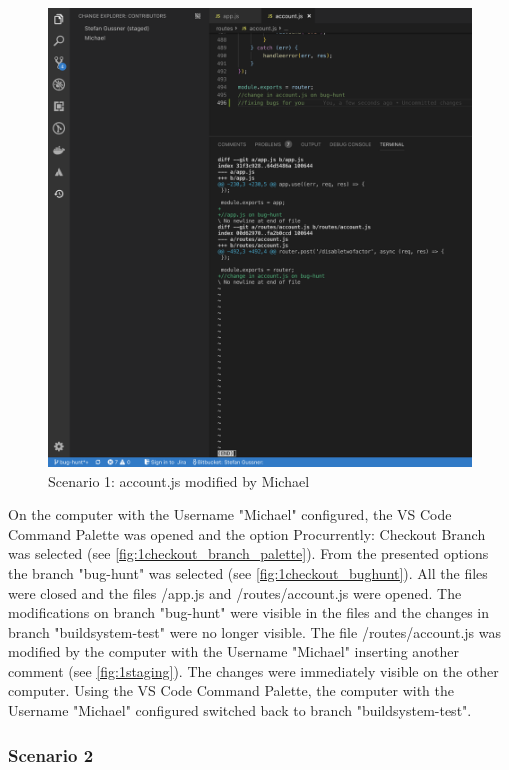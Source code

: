 \begin{figure}[h]
    \centering
    \includegraphics[width=1\textwidth]{figures/screenshots/scenarios/1staging_view.png}
    \caption{Scenario 1: account.js modified by Michael}
    \label{fig:1staging}
\end{figure}

On the computer with the Username "Michael" configured, the VS Code Command Palette was opened and the option Procurrently: Checkout Branch was selected (see \autoref{fig:1checkout_branch_palette}). From the presented options the branch "bug-hunt" was selected (see \autoref{fig:1checkout_bughunt}). All the files were closed and the files /app.js and /routes/account.js were opened. The modifications on branch "bug-hunt" were visible in the files and the changes in branch "buildsystem-test" were no longer visible. The file /routes/account.js was modified by the computer with the Username "Michael" inserting another comment (see \autoref{fig:1staging}). The changes were immediately visible on the other computer. Using the VS Code Command Palette, the computer with the Username "Michael" configured switched back to branch "buildsystem-test".

\subsubsection{Scenario 2}

